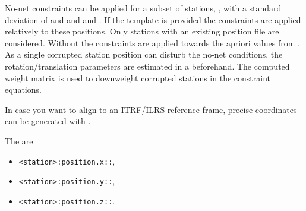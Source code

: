 No-net constraints can be applied for a subset of stations,
, with a
standard deviation of  and  and  and .
If the template  is provided
the constraints are applied relatively to these positions. Only stations with an existing position file
are considered. Without 
the constraints are applied towards the apriori values from
.
As a single corrupted station position can disturb the no-net conditions,
the rotation/translation parameters are estimated in a
beforehand. The computed weight matrix is used to downweight corrupted stations
in the constraint equations.

In case you want to align to an ITRF/ILRS reference frame, precise coordinates can be
generated with .

The  are
\begin{itemize}
\item \verb|<station>:position.x::|,
\item \verb|<station>:position.y::|,
\item \verb|<station>:position.z::|.
\end{itemize}


